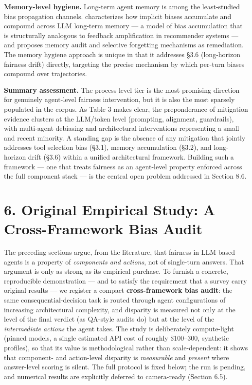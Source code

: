\documentclass[sigconf,nonacm]{acmart}
\begin{document}
\textbf{Memory-level hygiene.} Long-term agent memory is among the least-studied bias propagation channels. \cite{ma2026implicit} characterizes how implicit biases accumulate and compound across LLM long-term memory — a model of bias accumulation that is structurally analogous to feedback amplification in recommender systems \cite{mansoury2020feedback} — and proposes memory audit and selective forgetting mechanisms as remediation. The memory hygiene approach is unique in that it addresses §3.6 (long-horizon fairness drift) directly, targeting the precise mechanism by which per-turn biases compound over trajectories.

\textbf{Summary assessment.} The process-level tier is the most promising direction for genuinely agent-level fairness intervention, but it is also the most sparsely populated in the corpus. As Table 3 makes clear, the preponderance of mitigation evidence clusters at the LLM/token level (prompting, alignment, guardrails), with multi-agent debiasing and architectural interventions representing a small and recent minority. A standing gap is the absence of any mitigation that jointly addresses tool selection bias (§3.1), memory accumulation (§3.2), and long-horizon drift (§3.6) within a unified architectural framework. Building such a framework — one that treats fairness as an agent-level property enforced across the full component stack — is the central open problem addressed in Section 8.6.



\section{6. Original Empirical Study: A Cross-Framework Bias Audit}

The preceding sections argue, from the literature, that fairness in LLM-based agents is a property of \emph{components and actions}, not of single-turn answers. That argument is only as strong as its empirical purchase. To furnish a concrete, reproducible demonstration — and to satisfy the requirement that a survey carry original results — we register a compact \textbf{cross-framework bias audit}: the same consequential-decision task is routed through agent configurations of increasing architectural complexity, and disparity is measured not only at the level of the final verdict (as QA-style audits do) but at the level of the \emph{intermediate actions} the agent takes. The study is deliberately compute-light (pinned models, a single estimated API cost of roughly \$100--300, synthetic profiles), so that its value is methodological rather than scale-dependent: it shows that component- and action-level disparity is \emph{measurable} and \emph{present} where answer-level scoring is silent. The full protocol is fixed below; the run is pending, and numerical results are explicitly deferred to camera-ready (Section 6.5).
\end{document}

